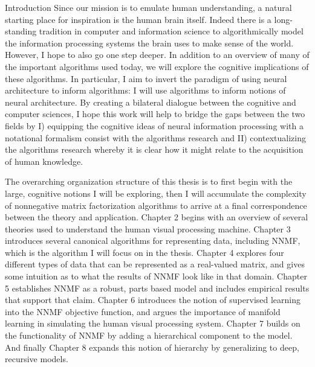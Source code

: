 \documentclass[12pt]{pom_thesis}
\begin{document}
\begin{chapter}{Introduction}
	Since our mission is to emulate human understanding, a natural starting place for inspiration is the human brain itself. Indeed there is a long-standing tradition in computer and information science to algorithmically model the information processing systems the brain uses to make sense of the world. However, I hope to also go one step deeper. In addition to an overview of many of the important algorithms used today, we will explore the cognitive implications of these algorithms. In particular, I aim to invert the paradigm of using neural architecture to inform algorithms: I will use algorithms to inform notions of neural architecture. By creating a bilateral dialogue between the cognitive and computer sciences, I hope this work will help to bridge the gaps between the two fields by I) equipping the cognitive ideas of neural information processing with a notational formalism consist with the algorithms research and II) contextualizing the algorithms research whereby it is clear how it might relate to the acquisition of human knowledge.
	
	
	The overarching organization structure of this thesis is to first begin with the large, cognitive notions I will be exploring, then I will accumulate the complexity of nonnegative matrix factorization algorithms to arrive at a final correspondence between the theory and application. Chapter 2 begins with an overview of several theories used to understand the human visual processing machine. Chapter 3 introduces several canonical algorithms for representing data, including NNMF, which is the algorithm I will focus on in the thesis. Chapter 4 explores four different types of data that can be represented as a real-valued matrix, and gives some intuition as to what the results of NNMF look like in that domain. Chapter 5 establishes NNMF as a robust, parts based model and includes  empirical results that support that claim. Chapter 6 introduces the notion of supervised learning into the NNMF objective function, and argues the importance of manifold learning in simulating the human visual processing system. Chapter 7 builds on the functionality of NNMF by adding a hierarchical component to the model. And finally Chapter 8 expands this notion of hierarchy by generalizing to deep, recursive models. 
\end{chapter}
\end{document}

